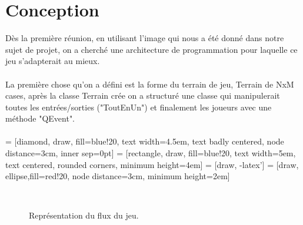 \documentclass{article}
\begin{document}
\section{Conception}
Dès la première réunion, en utilisant l'image qui nous a été donné dans notre sujet de projet, on a cherché une architecture de programmation pour laquelle ce jeu s'adapterait au mieux.\\~\\
La première chose qu'on a défini est la forme du terrain de jeu, Terrain de NxM cases, après la classe Terrain crée on a structuré une classe qui manipulerait toutes les entrées/sorties ("ToutEnUn") et finalement les joueurs avec une méthode "QEvent".\\~\\
 = [diamond, draw, fill=blue!20, 
    text width=4.5em, text badly centered, node distance=3cm, inner sep=0pt]
 = [rectangle, draw, fill=blue!20, 
    text width=5em, text centered, rounded corners, minimum height=4em]
 = [draw, -latex']
 = [draw, ellipse,fill=red!20, node distance=3cm,
    minimum height=2em]
\begin{figure}[h]
\centering
{}~\\
\caption{Représentation du flux du jeu.}
\end{figure}
\newpage
\end{document}
